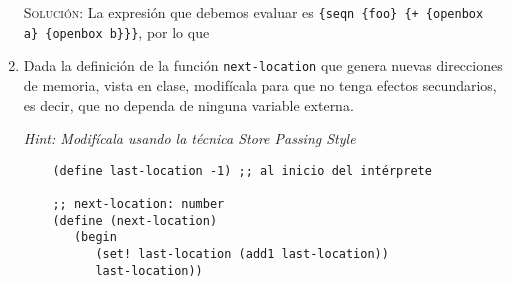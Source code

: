 \documentclass[letterpaper,11pt]{article}
\begin{document}
\begin{enumerate}
    \textsc{Solución:} La expresión que debemos evaluar es 
    \texttt{\{seqn \{foo\} \{+ \{openbox a\} \{openbox b\}\}\}}, por lo que 

    \item Dada la definición de la función \texttt{next-location} que genera 
    nuevas direcciones de memoria, vista en clase, modifícala para que no 
    tenga efectos secundarios, es decir, que no dependa de ninguna variable
    externa. 
    
    \textit{Hint: Modifícala usando la técnica Store Passing Style}
    \begin{verbatim}
    (define last-location -1) ;; al inicio del intérprete

    ;; next-location: number
    (define (next-location)
       (begin 
          (set! last-location (add1 last-location))
          last-location))
    \end{verbatim}
\end{enumerate}
\end{document}
